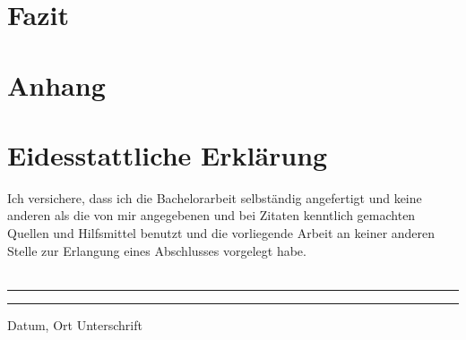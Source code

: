 \documentclass[a4paper,12pt,oneside]{article}
\begin{document}
  \section{Fazit}
  \newpage
  \printbibliography
  \newpage
  \section*{Anhang}
  \newpage
  \section*{Eidesstattliche Erklärung}
Ich versichere, dass ich die Bachelorarbeit selbständig angefertigt und keine anderen als die von mir angegebenen und bei Zitaten kenntlich gemachten Quellen und Hilfsmittel benutzt und die vorliegende Arbeit an keiner anderen Stelle zur Erlangung eines Abschlusses vorgelegt habe.\\\\
 

\vspace{50pt} 
\noindent\rule{5cm}{.4pt}\hfill\rule{5cm}{.4pt}\par 
\noindent Datum, Ort \hfill Unterschrift 
\end{document}
